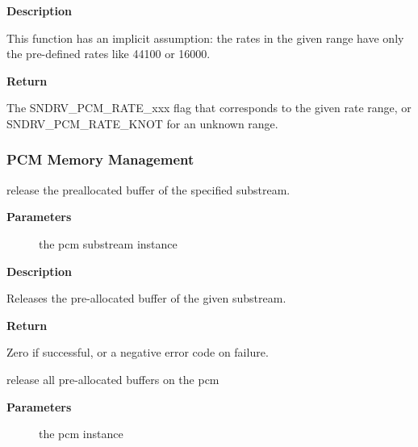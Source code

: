 \documentclass[a4paper,8pt,english]{sphinxmanual}
\begin{document}
\textbf{Description}

This function has an implicit assumption: the rates in the given range have
only the pre-defined rates like 44100 or 16000.

\textbf{Return}

The SNDRV\_PCM\_RATE\_xxx flag that corresponds to the given rate range,
or SNDRV\_PCM\_RATE\_KNOT for an unknown range.


\subsubsection{PCM Memory Management}
\label{sound/kernel-api/alsa-driver-api:pcm-memory-management}

\begin{fulllineitems}
\label{sound/kernel-api/alsa-driver-api:c.snd_pcm_lib_preallocate_free}
release the preallocated buffer of the specified substream.

\end{fulllineitems}


\textbf{Parameters}
\begin{description}
\item[{}] \leavevmode
the pcm substream instance

\end{description}

\textbf{Description}

Releases the pre-allocated buffer of the given substream.

\textbf{Return}

Zero if successful, or a negative error code on failure.

\begin{fulllineitems}
\label{sound/kernel-api/alsa-driver-api:c.snd_pcm_lib_preallocate_free_for_all}
release all pre-allocated buffers on the pcm

\end{fulllineitems}


\textbf{Parameters}
\begin{description}
\item[{}] \leavevmode
the pcm instance

\end{description}
\end{document}
